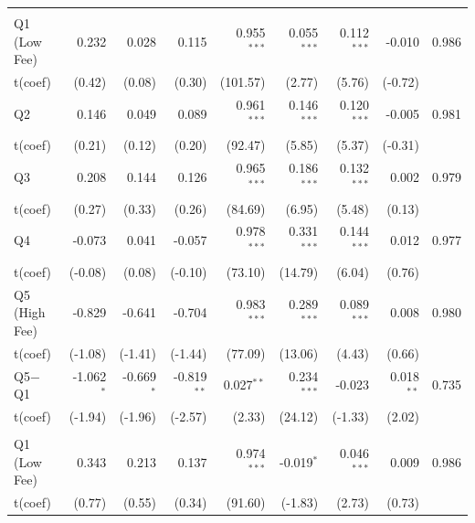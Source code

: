 \begin{table}[!htbp]
{\begin{tabular*}{\linewidth}{@{\extracolsep{\fill}}lrrrrrrrr}
\midrule
\addlinespace[0.3em]
\multicolumn{9}{l}{Active --- EW}\\
\hspace{1em}Q1 (Low Fee) & 0.232 & 0.028 & 0.115 & 0.955$^{***}$ & 0.055$^{***}$ & 0.112$^{***}$ & -0.010 & 0.986\\
\hspace{1em}t(coef) & (0.42) & (0.08) & (0.30) & (101.57) & (2.77) & (5.76) & (-0.72) & \\
\hspace{1em}Q2 & 0.146 & 0.049 & 0.089 & 0.961$^{***}$ & 0.146$^{***}$ & 0.120$^{***}$ & -0.005 & 0.981\\
\hspace{1em}t(coef) & (0.21) & (0.12) & (0.20) & (92.47) & (5.85) & (5.37) & (-0.31) & \\
\hspace{1em}Q3 & 0.208 & 0.144 & 0.126 & 0.965$^{***}$ & 0.186$^{***}$ & 0.132$^{***}$ & 0.002 & 0.979\\
\hspace{1em}t(coef) & (0.27) & (0.33) & (0.26) & (84.69) & (6.95) & (5.48) & (0.13) & \\
\hspace{1em}Q4 & -0.073 & 0.041 & -0.057 & 0.978$^{***}$ & 0.331$^{***}$ & 0.144$^{***}$ & 0.012 & 0.977\\
\hspace{1em}t(coef) & (-0.08) & (0.08) & (-0.10) & (73.10) & (14.79) & (6.04) & (0.76) & \\
\hspace{1em}Q5 (High Fee) & -0.829 & -0.641 & -0.704 & 0.983$^{***}$ & 0.289$^{***}$ & 0.089$^{***}$ & 0.008 & 0.980\\
\hspace{1em}t(coef) & (-1.08) & (-1.41) & (-1.44) & (77.09) & (13.06) & (4.43) & (0.66) & \\
\hspace{1em}Q5$-$Q1 & -1.062$^{*}$ & -0.669$^{*}$ & -0.819$^{**}$ & 0.027$^{**}$ & 0.234$^{***}$ & -0.023 & 0.018$^{**}$ & 0.735\\
\hspace{1em}t(coef) & (-1.94) & (-1.96) & (-2.57) & (2.33) & (24.12) & (-1.33) & (2.02) & \\
\addlinespace[0.3em]
\hline
\multicolumn{9}{l}{Active --- VW}\\
\hspace{1em}Q1 (Low Fee) & 0.343 & 0.213 & 0.137 & 0.974$^{***}$ & -0.019$^{*}$ & 0.046$^{***}$ & 0.009 & 0.986\\
\hspace{1em}t(coef) & (0.77) & (0.55) & (0.34) & (91.60) & (-1.83) & (2.73) & (0.73) & \\

\end{tabular*}}
\end{table}
